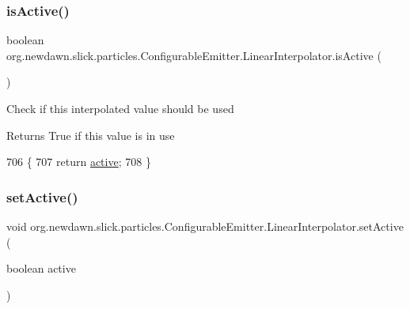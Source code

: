 \subsubsection{\texorpdfstring{is\+Active()}{isActive()}}
{\footnotesize\ttfamily boolean org.\+newdawn.\+slick.\+particles.\+Configurable\+Emitter.\+Linear\+Interpolator.\+is\+Active (\begin{DoxyParamCaption}{ }\end{DoxyParamCaption})\hspace{0.3cm}{\ttfamily [inline]}}

Check if this interpolated value should be used

\begin{DoxyReturn}{Returns}
True if this value is in use 
\end{DoxyReturn}

\begin{DoxyCode}
706                                   \{
707             \textcolor{keywordflow}{return} \mbox{\hyperlink{classorg_1_1newdawn_1_1slick_1_1particles_1_1_configurable_emitter_1_1_linear_interpolator_a0f28ab5311b6eaa1a406818811e39b54}{active}};
708         \}
\end{DoxyCode}
\mbox{\label{classorg_1_1newdawn_1_1slick_1_1particles_1_1_configurable_emitter_1_1_linear_interpolator_a7bbfe628f9c22e27a0f09f51d57cc38a}} 
\subsubsection{\texorpdfstring{set\+Active()}{setActive()}}
{\footnotesize\ttfamily void org.\+newdawn.\+slick.\+particles.\+Configurable\+Emitter.\+Linear\+Interpolator.\+set\+Active (\begin{DoxyParamCaption}\item[{boolean}]{active }\end{DoxyParamCaption})\hspace{0.3cm}{\ttfamily [inline]}}

